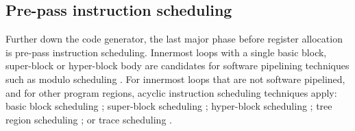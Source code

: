 \subsection{Pre-pass instruction scheduling}

Further down the code generator, the last major phase before register allocation
is pre-pass instruction scheduling. Innermost loops with a single basic block,
super-block or hyper-block body are candidates for software pipelining
techniques such as modulo scheduling \cite{Rau:1996:IJPP}. For innermost loops
that are not software pipelined, and for other program regions, acyclic
instruction scheduling techniques apply: basic block scheduling
\cite{Goodman:1988:ICS}; super-block scheduling \cite{Hwu:1993:JS}; hyper-block
scheduling \cite{Mahlke:1992:MICRO}; tree region scheduling
\cite{Havanki:1998:HPCA}; or trace scheduling \cite{Lowney:1993:JS}.

